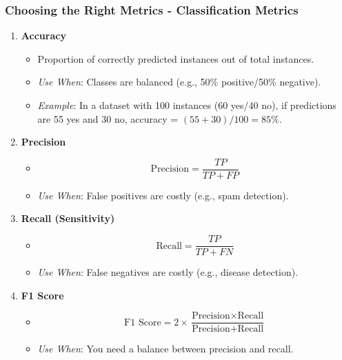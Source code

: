 \documentclass[aspectratio=169]{beamer}
\begin{document}
\begin{frame}[fragile]
    \frametitle{Choosing the Right Metrics - Classification Metrics}
    \begin{enumerate}
        \item \textbf{Accuracy}
        \begin{itemize}
            \item Proportion of correctly predicted instances out of total instances.
            \item \textit{Use When}: Classes are balanced (e.g., 50\% positive/50\% negative).
            \item \textit{Example}: In a dataset with 100 instances (60 yes/40 no), if predictions are 55 yes and 30 no, accuracy = \((55 + 30) / 100 = 85\%\).
        \end{itemize}
        \item \textbf{Precision}
        \begin{itemize}
            \item \[ \text{Precision} = \frac{TP}{TP + FP} \]
            \item \textit{Use When}: False positives are costly (e.g., spam detection).
        \end{itemize}
        \item \textbf{Recall (Sensitivity)}
        \begin{itemize}
            \item \[ \text{Recall} = \frac{TP}{TP + FN} \]
            \item \textit{Use When}: False negatives are costly (e.g., disease detection).
        \end{itemize}
        \item \textbf{F1 Score}
        \begin{itemize}
            \item \[ \text{F1 Score} = 2 \times \frac{\text{Precision} \times \text{Recall}}{\text{Precision} + \text{Recall}} \]
            \item \textit{Use When}: You need a balance between precision and recall.
        \end{itemize}
    \end{enumerate}
\end{frame}
\end{document}
